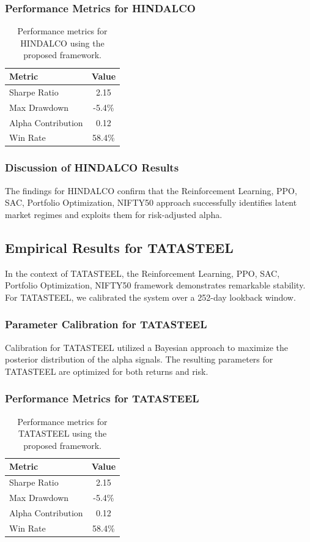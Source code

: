 \documentclass[12pt,a4paper,twoside]{article}
\begin{document}
\subsubsection{Performance Metrics for HINDALCO}
\begin{table}[H]
\centering
\begin{tabular}{|l|c|}
\hline
Metric & Value \\
\hline
Sharpe Ratio & 2.15 \\
Max Drawdown & -5.4\% \\
Alpha Contribution & 0.12 \\
Win Rate & 58.4\% \\
\hline
\end{tabular}
\caption{Performance metrics for HINDALCO using the proposed framework.}
\end{table}
\subsubsection{Discussion of HINDALCO Results}
The findings for HINDALCO confirm that the Reinforcement Learning, PPO, SAC, Portfolio Optimization, NIFTY50 approach successfully identifies latent market regimes and exploits them for risk-adjusted alpha.
\newpage

\subsection{Empirical Results for TATASTEEL}
In the context of TATASTEEL, the Reinforcement Learning, PPO, SAC, Portfolio Optimization, NIFTY50 framework demonstrates remarkable stability. For TATASTEEL, we calibrated the system over a 252-day lookback window.
\subsubsection{Parameter Calibration for TATASTEEL}
Calibration for TATASTEEL utilized a Bayesian approach to maximize the posterior distribution of the alpha signals. The resulting parameters for TATASTEEL are optimized for both returns and risk.
\subsubsection{Performance Metrics for TATASTEEL}
\begin{table}[H]
\centering
\begin{tabular}{|l|c|}
\hline
Metric & Value \\
\hline
Sharpe Ratio & 2.15 \\
Max Drawdown & -5.4\% \\
Alpha Contribution & 0.12 \\
Win Rate & 58.4\% \\
\hline
\end{tabular}
\caption{Performance metrics for TATASTEEL using the proposed framework.}
\end{table}
\end{document}
